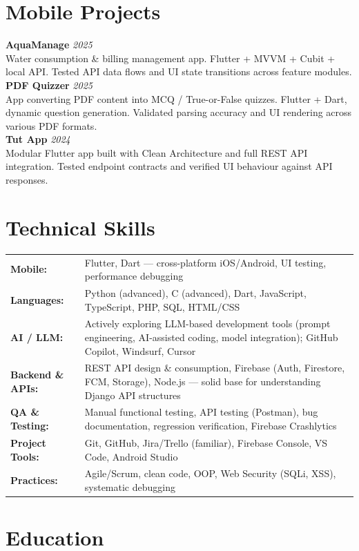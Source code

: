 \documentclass[10pt, a4paper]{article}
\newcommand{\project}[3]{%
  \textbf{\color{black}#1} \hfill \textit{\small\color{medgray}#2}\\
  {\small\color{darkgray}#3}\\
}
\newcommand{\skillrow}[2]{%
  \textbf{\small #1:} & {\small\color{darkgray} #2}\\[2pt]
}
\begin{document}
\section{Mobile Projects}

\project{AquaManage}{2025}%
  {Water consumption \& billing management app. Flutter + MVVM + Cubit + local API. Tested API data flows and UI state transitions across feature modules.}

\vspace{4pt}
\project{PDF Quizzer}{2025}%
  {App converting PDF content into MCQ / True-or-False quizzes. Flutter + Dart, dynamic question generation. Validated parsing accuracy and UI rendering across various PDF formats.}

\vspace{4pt}
\project{Tut App}{2024}%
  {Modular Flutter app built with Clean Architecture and full REST API integration. Tested endpoint contracts and verified UI behaviour against API responses.}

\section{Technical Skills}

\begin{tabular}{@{}p{3.2cm} p{13cm}@{}}
  \skillrow{Mobile}{Flutter, Dart — cross-platform iOS/Android, UI testing, performance debugging}
  \skillrow{Languages}{Python (advanced), C (advanced), Dart, JavaScript, TypeScript, PHP, SQL, HTML/CSS}
  \skillrow{AI / LLM}{Actively exploring LLM-based development tools (prompt engineering, AI-assisted coding, model integration); GitHub Copilot, Windsurf, Cursor}
  \skillrow{Backend \& APIs}{REST API design \& consumption, Firebase (Auth, Firestore, FCM, Storage), Node.js — solid base for understanding Django API structures}
  \skillrow{QA \& Testing}{Manual functional testing, API testing (Postman), bug documentation, regression verification, Firebase Crashlytics}
  \skillrow{Project Tools}{Git, GitHub, Jira/Trello (familiar), Firebase Console, VS Code, Android Studio}
  \skillrow{Practices}{Agile/Scrum, clean code, OOP, Web Security (SQLi, XSS), systematic debugging}
\end{tabular}

\section{Education}
\end{document}
